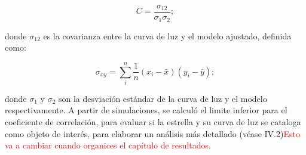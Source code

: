 \begin{equation}
\displaystyle C=\frac{\sigma_{12}}{\sigma_{1}\sigma_{2}};
\end{equation}
  
donde $\sigma_{12}$ es la covarianza entre la curva de luz y el modelo ajustado, definida como:
  
\begin{equation}
\displaystyle \sigma_{xy}= \sum\limits_{i}^{n} \frac{1}{n}(x_{i}-\bar{x})(y_{i}-\bar{y});
\end{equation}
  
donde $\sigma_{1}$ y $\sigma_{2}$ son la desviación estándar de la curva de luz y el modelo respectivamente. A partir de simulaciones, se calculó el limite inferior para el coeficiente de correlación, para evaluar si la estrella y su curva de luz se cataloga como objeto de interés, para elaborar un análisis más detallado (véase IV.2)\textcolor{red}{Esto va a cambiar cuando organices el capítulo de resultados}.
